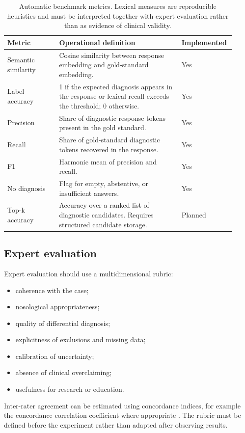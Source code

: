\documentclass[11pt,a4paper]{article}
\begin{document}
\begin{table}[htbp]
\centering
\begin{tabular}{p{0.22\linewidth}p{0.52\linewidth}p{0.18\linewidth}}
\toprule
\textbf{Metric} & \textbf{Operational definition} & \textbf{Implemented}\\
\midrule
Semantic similarity & Cosine similarity between response embedding and gold-standard embedding. & Yes\\
Label accuracy & 1 if the expected diagnosis appears in the response or lexical recall exceeds the threshold; 0 otherwise. & Yes\\
Precision & Share of diagnostic response tokens present in the gold standard. & Yes\\
Recall & Share of gold-standard diagnostic tokens recovered in the response. & Yes\\
F1 & Harmonic mean of precision and recall. & Yes\\
No diagnosis & Flag for empty, abstentive, or insufficient answers. & Yes\\
Top-k accuracy & Accuracy over a ranked list of diagnostic candidates. Requires structured candidate storage. & Planned\\
\bottomrule
\end{tabular}
\caption{Automatic benchmark metrics. Lexical measures are reproducible heuristics and must be interpreted together with expert evaluation rather than as evidence of clinical validity.}
\label{tab:automatic-metrics-en}
\end{table}

\subsection{Expert evaluation}
Expert evaluation should use a multidimensional rubric:
\begin{itemize}
  \item coherence with the case;
  \item nosological appropriateness;
  \item quality of differential diagnosis;
  \item explicitness of exclusions and missing data;
  \item calibration of uncertainty;
  \item absence of clinical overclaiming;
  \item usefulness for research or education.
\end{itemize}

Inter-rater agreement can be estimated using concordance indices, for example the concordance correlation coefficient where appropriate \citep{barnhart2002ccc}. The rubric must be defined before the experiment rather than adapted after observing results.
\end{document}
